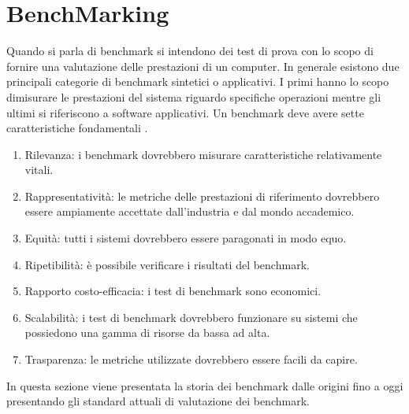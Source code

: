 \documentclass[12pt,a4paper]{report}
\begin{document}
\chapter{BenchMarking}
Quando si parla di benchmark si intendono dei test di prova con lo scopo di fornire una valutazione delle prestazioni di un computer. In generale esistono due principali categorie di benchmark sintetici o applicativi. I primi hanno lo scopo dimisurare le prestazioni del sistema riguardo specifiche operazioni mentre gli ultimi si riferiscono a software applicativi. Un benchmark deve avere sette caratteristiche fondamentali \cite{benchmarkIntro}.
\begin{enumerate}
    \item Rilevanza: i benchmark dovrebbero misurare caratteristiche relativamente vitali.
  \item Rappresentatività: le metriche delle prestazioni di riferimento dovrebbero essere ampiamente accettate dall'industria e dal mondo accademico.
  \item Equità: tutti i sistemi dovrebbero essere paragonati in modo equo.
  \item Ripetibilità: è possibile verificare i risultati del benchmark.
  \item Rapporto costo-efficacia: i test di benchmark sono economici.
  \item Scalabilità: i test di benchmark dovrebbero funzionare su sistemi che possiedono una gamma di risorse da bassa ad alta.
  \item Trasparenza: le metriche utilizzate dovrebbero essere facili da capire.
\end{enumerate}
In questa sezione viene presentata la storia dei benchmark dalle origini fino a oggi presentando gli standard attuali di valutazione dei benchmark.

 
\end{document}
